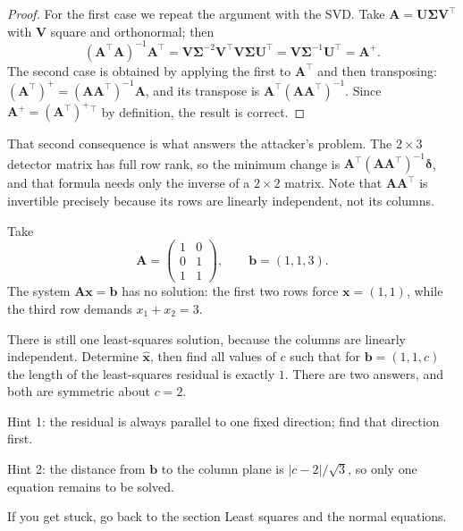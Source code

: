 \begin{proof}
For the first case we repeat the argument with the SVD. Take
$\mathbf{A}=\mathbf{U}\boldsymbol{\Sigma}\mathbf{V}^{\top}$ with $\mathbf{V}$ square and
orthonormal; then
\[
  (\mathbf{A}^{\top}\mathbf{A})^{-1}\mathbf{A}^{\top}
  =\mathbf{V}\boldsymbol{\Sigma}^{-2}\mathbf{V}^{\top}\mathbf{V}\boldsymbol{\Sigma}\mathbf{U}^{\top}
  =\mathbf{V}\boldsymbol{\Sigma}^{-1}\mathbf{U}^{\top}=\mathbf{A}^{+}.
\]
The second case is obtained by applying the first to $\mathbf{A}^{\top}$ and then
transposing: $(\mathbf{A}^{\top})^{+}=(\mathbf{A}\mathbf{A}^{\top})^{-1}\mathbf{A}$,
and its transpose is $\mathbf{A}^{\top}(\mathbf{A}\mathbf{A}^{\top})^{-1}$. Since
$\mathbf{A}^{+}=(\mathbf{A}^{\top})^{+}{}^{\top}$ by definition, the result is correct.
\end{proof}

That second consequence is what answers the attacker's problem. The $2\times3$ detector matrix has full
row rank, so the minimum change is
$\mathbf{A}^{\top}(\mathbf{A}\mathbf{A}^{\top})^{-1}\boldsymbol{\delta}$, and that formula
needs only the inverse of a $2\times2$ matrix. Note that
$\mathbf{A}\mathbf{A}^{\top}$ is invertible precisely because its rows are linearly independent, not
its columns.

\begin{tantangan}
Take
\[
  \mathbf{A}=\begin{pmatrix}1&0\\0&1\\1&1\end{pmatrix},\qquad \mathbf{b}=(1,1,3).
\]
The system $\mathbf{A}\mathbf{x}=\mathbf{b}$ has no solution: the first two rows force
$\mathbf{x}=(1,1)$, while the third row demands $x_{1}+x_{2}=3$.

There is still one least-squares solution, because the columns are linearly independent. Determine $\hat{\mathbf{x}}$, then find all values of $c$ such that for $\mathbf{b}=(1,1,c)$ the length of the least-squares residual is exactly $1$. There are two answers, and both are symmetric about $c=2$.

Hint 1: the residual is always parallel to one fixed direction; find that direction first.

Hint 2: the distance from $\mathbf{b}$ to the column plane is $|c-2|/\sqrt{3}$, so only one equation remains to be solved.

If you get stuck, go back to the section Least squares and the normal equations.
\end{tantangan}

